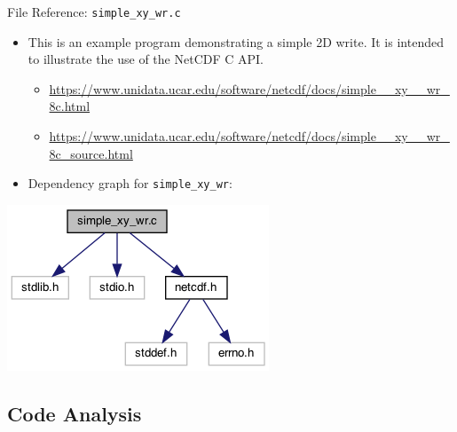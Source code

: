 \documentclass[compress,11pt,xcolor=svgnames,aspectratio=169]{beamer}
\begin{document}
\begin{frame}[fragile]{File Reference: \texttt{simple\_xy\_wr.c}}

\begin{itemize}
\setlength\itemsep{0.4cm}

  \item This is an example program demonstrating a simple 2D write. It is intended to illustrate the use of the NetCDF C API.

    \begin{itemize}
    \setlength\itemsep{0.2cm}
      \item {\scriptsize \url{https://www.unidata.ucar.edu/software/netcdf/docs/simple__xy__wr_8c.html}}
      \item {\scriptsize \url{https://www.unidata.ucar.edu/software/netcdf/docs/simple__xy__wr_8c_source.html}}
    \end{itemize}

  \item Dependency graph for \verb|simple_xy_wr|:

\end{itemize}

\begin{center}
\includegraphics[scale=0.5]{fig/simple__xy__wr_8c__incl}
\end{center}

\end{frame}

\subsection{Code Analysis}
\end{document}
